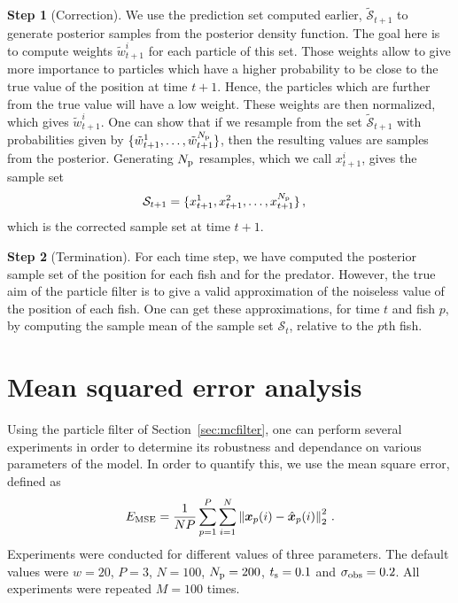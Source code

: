 \documentclass[final]{aomart}
\newtheorem[{}\it]{thm}{Theorem}[section]
\theoremstyle{definition}
\newtheorem*[{}\it]{notation}{Notation}
\newtheorem{step}{Step}
\numberwithin{equation}{section}
\newcommand{\ts}{t_\textnormal{s}}
\newcommand{\np}{N_\textnormal{p}}
\newcommand{\sset}{\mathcal{S}}
\newcommand{\enVert}[1]{\left\lVert#1\right\rVert}
\let\norm=\enVert
\begin{document}
\begin{step}[Correction]
We use the prediction set computed earlier, \(\tilde{\sset}_{t+1}\) to generate posterior samples from the posterior density function.
The goal here is to compute weights \( \tilde{w}_{t+1}^i \) for each particle of this set.
Those weights allow to give more importance to particles which have a higher probability to be close to the true value of the position at time \(t+1\).
Hence, the particles which are further from the true value will have a low weight.
These weights are then normalized, which gives \(\tilde{w}_{t+1}^i\).
One can show that if we resample from the set \(\tilde{\sset}_{t+1}\) with probabilities given by \( \{ \tilde{w}_{t+1}^1, \ldots, \tilde{w}_{t+1}^{\np} \} \), then the resulting values are samples from the posterior.
Generating \(\np\) resamples, which we call \(x_{t+1}^i\), gives the sample set
\begin{align}
	\sset_{t+1} &= \{ x_{t+1}^1, x_{t+1}^2, \ldots ,x_{t+1}^{\np} \}\,,
\end{align}
which is the corrected sample set at time \( t+1 \).
\end{step}

\begin{step}[Termination]
For each time step, we have computed the posterior sample set of the position for each fish and for the predator.
However, the true aim of the particle filter is to give a valid approximation of the noiseless value of the position of each fish.
One can get these approximations, for time \(t\) and fish \(p\), by computing the sample mean of the sample set \(\sset_{t}\), relative to the \(p\)th fish.
\end{step}

\section{Mean squared error analysis}
Using the particle filter of Section~\ref{sec:mcfilter}, one can perform several experiments in order to determine its robustness and dependance on various parameters of the model.
In order to quantify this, we use the mean square error, defined as
\begin{align}
E_{\textnormal{MSE}} = \frac{1}{NP} \sum_{p=1}^P \sum_{i=1}^N \norm{\bm{x}_p(i) - \hat{\bm{x}}_p(i)}_{2}^2\,.
\end{align}
Experiments were conducted for different values of three parameters.
The default values were \(w = 20\), \(P = 3\), \(N = 100\),  \(\np = 200\), \(\ts = 0.1\) and \(\sigma_{\textnormal{obs}} = 0.2\).
All experiments were repeated \(M = 100\) times.
\end{document}
